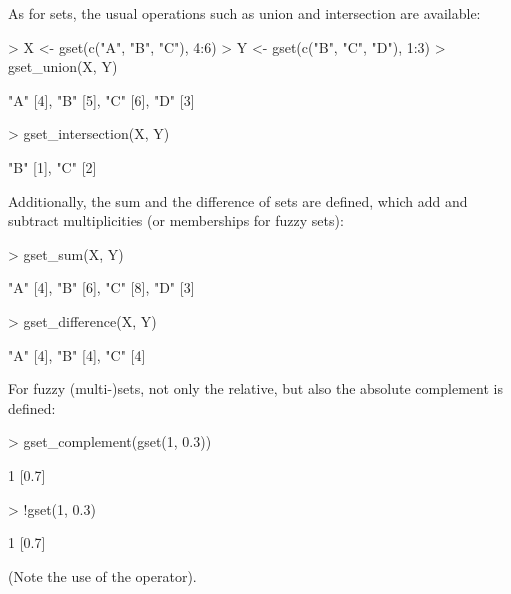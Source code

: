 \documentclass[article]{jss}
\begin{document}
As for sets, the usual operations
such as union and intersection are available:
\begin{Schunk}
\begin{Sinput}
> X <- gset(c("A", "B", "C"), 4:6)
> Y <- gset(c("B", "C", "D"), 1:3)
> gset_union(X, Y)
\end{Sinput}
\begin{Soutput}
{"A" [4], "B" [5], "C" [6], "D" [3]}
\end{Soutput}
\begin{Sinput}
> gset_intersection(X, Y)
\end{Sinput}
\begin{Soutput}
{"B" [1], "C" [2]}
\end{Soutput}
\end{Schunk}
Additionally, the sum and the difference of sets are defined,
which add and subtract multiplicities (or memberships for fuzzy sets):
\begin{Schunk}
\begin{Sinput}
> gset_sum(X, Y)
\end{Sinput}
\begin{Soutput}
{"A" [4], "B" [6], "C" [8], "D" [3]}
\end{Soutput}
\begin{Sinput}
> gset_difference(X, Y)
\end{Sinput}
\begin{Soutput}
{"A" [4], "B" [4], "C" [4]}
\end{Soutput}
\end{Schunk}
For fuzzy (multi-)sets, not only the relative, but also the
absolute complement is defined:
\begin{Schunk}
\begin{Sinput}
> gset_complement(gset(1, 0.3))
\end{Sinput}
\begin{Soutput}
{1 [0.7]}
\end{Soutput}
\begin{Sinput}
> !gset(1, 0.3)
\end{Sinput}
\begin{Soutput}
{1 [0.7]}
\end{Soutput}
\end{Schunk}
(Note the use of the \code{!} operator).
\end{document}
